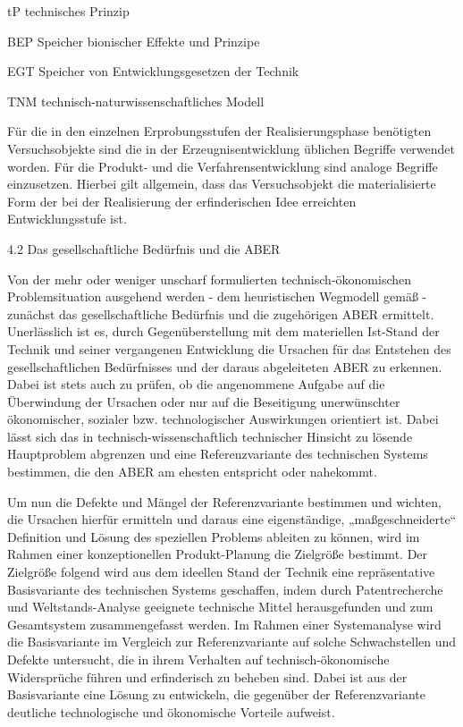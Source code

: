 \documentclass[12pt,a4paper]{article}
\begin{document}
tP                technisches Prinzip

BEP            Speicher bionischer Effekte und Prinzipe

EGT            Speicher von Entwicklungsgesetzen der Technik

TNM            technisch-naturwissenschaftliches Modell


Für die in den einzelnen Erprobungsstufen der Realisierungsphase benötigten Versuchsobjekte sind die in der Erzeugnisentwicklung üblichen Begriffe verwendet worden. Für die Produkt- und die Verfahrensentwicklung sind analoge Begriffe einzusetzen. Hierbei gilt allgemein, dass das Versuchsobjekt die materialisierte Form der bei der Realisierung der erfinderischen Idee erreichten Entwicklungsstufe ist.


4.2  Das gesellschaftliche Bedürfnis und die ABER

Von der mehr oder weniger unscharf formulierten technisch-ökonomischen Problemsituation ausgehend werden - dem heuristischen Wegmodell gemäß - zunächst das gesellschaftliche Bedürfnis und die zugehörigen ABER ermittelt. Unerlässlich ist es, durch Gegenüberstellung mit dem materiellen Ist-Stand der Technik und seiner vergangenen Entwicklung die Ursachen für das Entstehen des gesellschaftlichen Bedürfnisses und der daraus abgeleiteten ABER zu erkennen. Dabei ist stets auch zu prüfen, ob die angenommene Aufgabe auf die Überwindung der Ursachen oder nur auf die Beseitigung unerwünschter ökonomischer, sozialer bzw. technologischer Auswirkungen orientiert ist. Dabei lässt sich das in technisch-wissenschaftlich technischer Hinsicht zu lösende Hauptproblem abgrenzen und eine Referenzvariante des technischen Systems bestimmen, die den ABER am ehesten entspricht oder nahekommt.

Um nun die Defekte und Mängel der Referenzvariante bestimmen und wichten, die Ursachen hierfür ermitteln und daraus eine eigenständige, „maßgeschneiderte“ Definition und Lösung des speziellen Problems ableiten zu können, wird im Rahmen einer konzeptionellen Produkt-Planung die Zielgröße bestimmt. Der Zielgröße folgend wird aus dem ideellen Stand der Technik eine repräsentative Basisvariante des technischen Systems geschaffen, indem durch Patentrecherche und Weltstands-Analyse geeignete technische Mittel herausgefunden und zum Gesamtsystem zusammengefasst werden. Im Rahmen einer Systemanalyse wird die Basisvariante im Vergleich zur Referenzvariante auf solche Schwachstellen und Defekte untersucht, die in ihrem Verhalten auf technisch-ökonomische Widersprüche führen und erfinderisch zu beheben sind. Dabei ist aus der Basisvariante eine Lösung zu entwickeln, die gegenüber der Referenzvariante deutliche technologische und ökonomische Vorteile aufweist.
\end{document}
